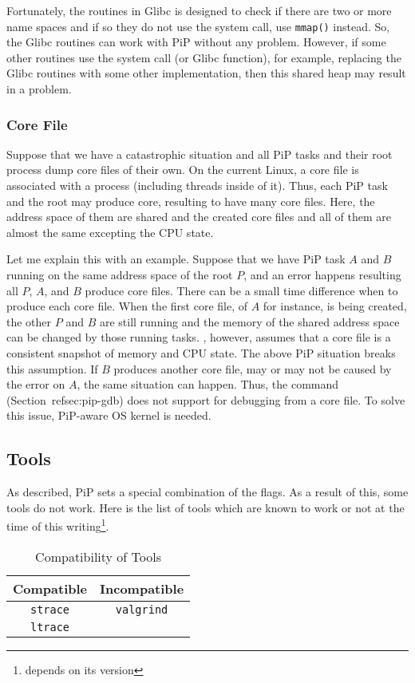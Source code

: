 Fortunately, the  routines in Glibc is designed to check if
there are two or more name spaces and if so they do not use the
 system call, use {\tt mmap()} instead. So, the Glibc
 routines can work with PiP without any
problem. However, if some other routines use the 
system call (or  Glibc function), for example,
replacing the Glibc  routines with some other
 implementation, then this shared heap may result in a 
problem.

\subsubsection{Core File}

Suppose that we have a catastrophic situation and all PiP tasks and
their root process dump core files of their own. On the current Linux,
a core file is associated with a process (including threads inside of
it). Thus, each PiP task and the root may produce core, resulting to
have many core files. Here, the address space of them are shared and
the created core files and all of them are almost the same excepting
the CPU state. 

Let me explain this with an example. Suppose that we have PiP task $A$
and $B$ running on the same address space of the root $P$, and an
error happens resulting all $P$, $A$, and $B$ produce core
files. There can be a small time difference when to produce each core
file. When the first core file, of $A$ for instance, is being created,
the other $P$ and $B$ are still running and the memory of the shared 
address space can be changed by those running tasks.
, however, assumes that a core file is a consistent snapshot
of memory and CPU state. The above PiP situation breaks this
assumption. If $B$ produces another core file, may or may not be
caused by the error on $A$, the same situation can happen.
Thus, the  command (Section~ref{sec:pip-gdb}) does
not support for debugging from a core file. To solve this issue,
PiP-aware OS kernel is needed. 

\subsection{Tools}

As described, PiP sets a special combination of the 
flags. As a result of this, some tools do not work. Here is the list
of tools which are known to work or not at the time of this
writing\footnote{ depends on its version}. 

\begin{table}[ht]
  \centering
  \caption{Compatibility of Tools}
  \vspace{3mm}
  \begin{tabular}{c|c}
    \hline
    Compatible & Incompatible \\
    \hline
        {\tt strace} & {\tt valgrind} \\
        {\tt ltrace} \\
        \hline
  \end{tabular}
\end{table}
